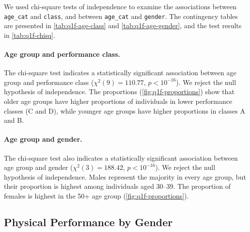 
We used chi-square tests of independence to examine the associations between \texttt{age\_cat} and \texttt{class}, and between \texttt{age\_cat} and \texttt{gender}.
The contingency tables are presented in \autoref{tab:q1f-age-class} and \autoref{tab:q1f-age-gender}, and the test results in \autoref{tab:q1f-chisq}.

\paragraph{Age group and performance class.}
The chi-square test indicates a statistically significant association between age group and performance class ($\chi^2(9) = 110.77$, $p < 10^{-16}$). We reject the null hypothesis of independence.
The proportions (\autoref{fig:q1f-proportions}) show that older age groups have higher proportions of individuals in lower performance classes (C and D), while younger age groups have higher proportions in classes A and B.

\paragraph{Age group and gender.}
The chi-square test also indicates a statistically significant association between age group and gender ($\chi^2(3) = 188.42$, $p < 10^{-16}$). We reject the null hypothesis of independence.
Males represent the majority in every age group, but their proportion is highest among individuals aged 30--39.
The proportion of females is highest in the 50+ age group (\autoref{fig:q1f-proportions}).

\subsection{Physical Performance by Gender}\label{sec:q1g}


